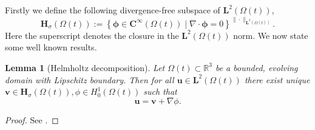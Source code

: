 \documentclass[a4paper]{amsart}
\numberwithin{equation}{section}
\newcommand{\grad}{\nabla}
\newcommand{\Div}{\nabla \cdot}
\theoremstyle{plain}
\newtheorem{lemma}[theorem]{Lemma}
\newcommand{\mbf}[1]{\mathbf{#1}}
\newcommand{\mbb}[1]{\mathbb{#1}}
\begin{document}
Firstly we define the following divergence-free subspace of $\mbf{L}^2(\Omega(t))$,
\[ \mbf{H}_\sigma(\Omega(t)) := \left\{ \boldsymbol{\phi} \in \mbf{C}^\infty(\Omega(t)) \mid \Div \boldsymbol{\phi} = 0 \right\}^{\|\cdot\|_{\mbf{L}^2(\Omega(t))}}.  \]
Here the superscript denotes the closure in the $\mbf{L}^2(\Omega(t))$ norm.
We now state some well known results.

\begin{lemma}[Helmholtz decomposition]
	Let $\Omega(t) \subset \mbb{R}^3$ be a bounded, evolving domain with Lipschitz boundary.
	Then for all $\mbf{u} \in \mbf{L}^2(\Omega(t))$ there exist unique $\mbf{v} \in \mbf{H}_\sigma(\Omega(t)), \phi \in H_0^1(\Omega(t))$ such that
	\[ \mbf{u} = \mbf{v} + \grad \phi.\]
\end{lemma}
\begin{proof}
    See \cite[Theorem 2.16]{robinson2016three}.
\end{proof}
\end{document}
